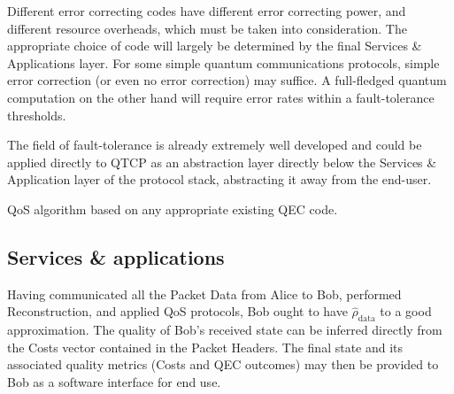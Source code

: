 \documentclass[aps,rmp,twocolumn,amsmath,amssymb,nofootinbib,superscriptaddress]{revtex4}
\begin{document}
Different error correcting codes have different error correcting power, and different resource overheads, which must be taken into consideration. The appropriate choice of code will largely be determined by the final {\sc Services \& Applications} layer. For some simple quantum communications protocols, simple error correction (or even no error correction) may suffice. A full-fledged quantum computation on the other hand will require error rates within a fault-tolerance thresholds.

The field of fault-tolerance is already extremely well developed and could be applied directly to QTCP as an abstraction layer directly below the {\sc Services \& Application} layer of the protocol stack, abstracting it away from the end-user.

\begin{table}[!htb]
\caption{QoS algorithm based on any appropriate existing QEC code.} \label{tab:qos}
\end{table}

%
%

\subsection{Services \& applications}

Having communicated all the {\sc Packet Data} from Alice to Bob, performed {\sc Reconstruction}, and applied {\sc QoS} protocols, Bob ought to have $\hat\rho_\mathrm{data}$ to a good approximation. The quality of Bob's received state can be inferred directly from the {\sc Costs} vector contained in the {\sc Packet Headers}. The final state and its associated quality metrics ({\sc Costs} and QEC outcomes) may then be provided to Bob as a software interface for end use.
\end{document}
